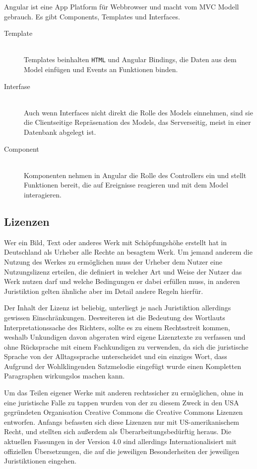 Angular ist eine App Platform für Webbrowser und macht vom MVC Modell gebrauch.
Es gibt Components, Templates und Interfaces.
\begin{description}
  \item[Template] \mbox{} \\ Templates beinhalten \texttt{HTML} und Angular
    Bindings, die Daten aus dem Model einfügen und Events an Funktionen binden.
  \item[Interfase] \mbox{} \\ Auch wenn Interfaces nicht direkt die Rolle des
    Models einnehmen, sind sie die Clientseitige Repräsenation des Models, das
    Serverseitig, meist in einer Datenbank abgelegt ist.
  \item[Component] \mbox{} \\ Komponenten nehmen in Angular die Rolle des
    Controllers ein und stellt Funktionen bereit, die auf Ereignisse reagieren
    und mit dem Model interagieren.
\end{description}

\subsection{Lizenzen}

Wer ein Bild, Text oder anderes Werk mit Schöpfungshöhe erstellt hat in
Deutschland als Urheber alle Rechte an besagtem Werk. Um jemand anderem die
Nutzung des Werkes zu ermöglichen muss der Urheber dem Nutzer eine
Nutzungslizenz erteilen, die definiert in welcher Art und Weise der Nutzer das
Werk nutzen darf und welche Bedingungen er dabei erfüllen muss, in anderen
Juristiktion gelten ähnliche aber im Detail andere Regeln hierfür.

Der Inhalt der Lizenz ist beliebig, unterliegt je nach Juristiktion allerdings
gewissen Einschränkungen. Desweiteren ist die Bedeutung des Wortlauts
Interpretationssache des Richters, sollte es zu einem Rechtsstreit kommen,
weshalb Unkundigen davon abgeraten wird eigene Lizenztexte zu verfassen und ohne
Rücksprache mit einem Fachkundigen zu verwenden, da sich die juristische Sprache
von der Alltagssprache unterscheidet und ein einziges Wort, dass Aufgrund der
Wohlklingenden Satzmelodie eingefügt wurde einen Kompletten Paragraphen
wirkungslos machen kann.

Um das Teilen eigener Werke mit anderen rechtssicher zu ermöglichen, ohne in
eine juristische Falle zu tappen wurden von der zu diesem Zweck in den USA
gegründeten Organisation Creative Commons die Creative Commons Lizenzen
entworfen. Anfangs befassten sich diese Lizenzen nur mit US-amerikanischem
Recht, und stellten sich außerdem als Überarbeitungsbedürftig heraus. Die
aktuellen Fassungen in der Version 4.0 sind allerdings Internationalisiert mit
offiziellen Übersetzungen, die auf die jeweiligen Besonderheiten der jeweiligen
Juristiktionen eingehen.

